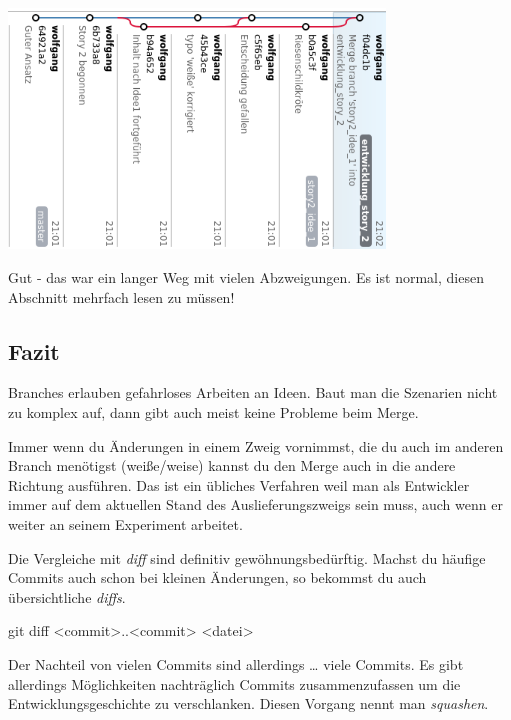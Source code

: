 \documentclass[
  letterpaper,
  DIV=11]{scrreprt}
\newenvironment{Shaded}{\begin{snugshade}}{\end{snugshade}}
\newcommand{\FunctionTok}[1]{\textcolor[rgb]{0.28,0.35,0.67}{#1}}
\newcommand{\NormalTok}[1]{\textcolor[rgb]{0.00,0.23,0.31}{#1}}
\newcommand{\OperatorTok}[1]{\textcolor[rgb]{0.37,0.37,0.37}{#1}}
\begin{document}
\includegraphics[width=10cm,height=\textheight]{bilder/bash/buch_2.png}

Gut - das war ein langer Weg mit vielen Abzweigungen. Es ist normal,
diesen Abschnitt mehrfach lesen zu müssen!

\subsection{Fazit}\label{fazit}

Branches erlauben gefahrloses Arbeiten an Ideen. Baut man die Szenarien
nicht zu komplex auf, dann gibt auch meist keine Probleme beim Merge.

Immer wenn du Änderungen in einem Zweig vornimmst, die du auch im
anderen Branch menötigst (weiße/weise) kannst du den Merge auch in die
andere Richtung ausführen. Das ist ein übliches Verfahren weil man als
Entwickler immer auf dem aktuellen Stand des Auslieferungszweigs sein
muss, auch wenn er weiter an seinem Experiment arbeitet.

Die Vergleiche mit \emph{diff} sind definitiv gewöhnungsbedürftig.
Machst du häufige Commits auch schon bei kleinen Änderungen, so bekommst
du auch übersichtliche \emph{diffs}.

\begin{Shaded}
\begin{Highlighting}[]
\FunctionTok{git}\NormalTok{ diff }\OperatorTok{\textless{}}\NormalTok{commit}\OperatorTok{\textgreater{}}\NormalTok{..}\OperatorTok{\textless{}}\NormalTok{commit}\OperatorTok{\textgreater{}} \OperatorTok{\textless{}}\NormalTok{datei}\OperatorTok{\textgreater{}}
\end{Highlighting}
\end{Shaded}

Der Nachteil von vielen Commits sind allerdings \ldots{} viele Commits.
Es gibt allerdings Möglichkeiten nachträglich Commits zusammenzufassen
um die Entwicklungsgeschichte zu verschlanken. Diesen Vorgang nennt man
\emph{squashen}.
\end{document}
